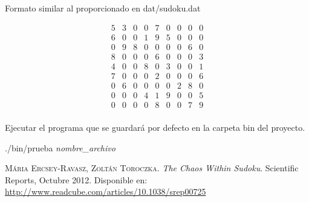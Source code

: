 \documentclass[11pt, a4paper]{article}
\theoremstyle{theorem-style}
\theoremstyle{definition-style}
\theoremstyle{remark-style}
\theoremstyle{example-style}
\begin{document}
Formato similar al proporcionado en dat/sudoku.dat

\[
\begin{array}{ccccccccc}
5 & 3 & 0 & 0 & 7 & 0 & 0 & 0 & 0\\
6 & 0 & 0 & 1 & 9 & 5 & 0 & 0 & 0\\
0 & 9 & 8 & 0 & 0 & 0 & 0 & 6 & 0\\
8 & 0 & 0 & 0 & 6 & 0 & 0 & 0 & 3\\
4 & 0 & 0 & 8 & 0 & 3 & 0 & 0 & 1\\
7 & 0 & 0 & 0 & 2 & 0 & 0 & 0 & 6\\
0 & 6 & 0 & 0 & 0 & 0 & 2 & 8 & 0\\
0 & 0 & 0 & 4 & 1 & 9 & 0 & 0 & 5\\
0 & 0 & 0 & 0 & 8 & 0 & 0 & 7 & 9\\
\end{array}
\]

Ejecutar el programa que se guardará por defecto en la carpeta bin del proyecto. 

./bin/prueba \textit{nombre\_archivo}
\begin{thebibliography}{X}
 \textsc{Mária Ercsey-Ravasz, Zoltán Toroczka}.
\textit{The Chaos Within Sudoku}.
Scientific Reports, Octubre 2012. Disponible en: \url{http://www.readcube.com/articles/10.1038/srep00725}
\end{thebibliography}	
\end{document}
